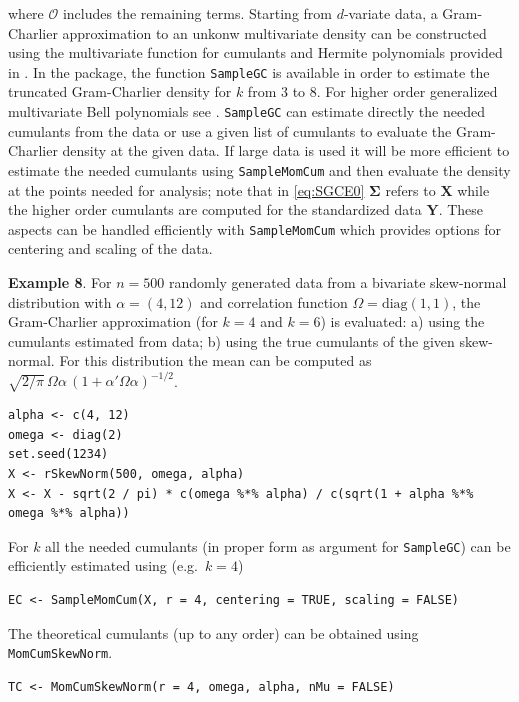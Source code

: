 where \(\mathcal{O}\) includes the remaining terms. Starting from \(d\)-variate data, a Gram-Charlier approximation to an unkonw multivariate density can be constructed using the multivariate function for cumulants and Hermite polynomials provided in . In the package, the function \texttt{SampleGC} is available in order to estimate the truncated Gram-Charlier density for \(k\) from \(3\) to \(8\). For higher order generalized multivariate Bell polynomials see . \texttt{SampleGC} can estimate directly the needed cumulants from the data or use a given list of cumulants to evaluate the Gram-Charlier density at the given data. If large data is used it will be more efficient to estimate the needed cumulants using \texttt{SampleMomCum} and then evaluate the density at the points needed for analysis; note that in \eqref{eq:SGCE0} \(\boldsymbol{\Sigma}\) refers to \(\mathbf{X}\) while the higher order cumulants are computed for the standardized data \(\mathbf{Y}\). These aspects can be handled efficiently with \texttt{SampleMomCum} which provides options for centering and scaling of the data.

\textbf{Example 8}. For \(n=500\) randomly generated data from a bivariate skew-normal distribution with \(\alpha=(4,12)\) and correlation function \(\Omega= \text{diag} (1,1)\), the Gram-Charlier approximation (for \(k=4\) and \(k=6\)) is evaluated: a) using the cumulants estimated from data; b) using the true cumulants of the given skew-normal. For this distribution the mean can be computed as \(\sqrt{2/\pi} \, \Omega \alpha \, (1+\alpha' \Omega \alpha)^{-1/2}\).

\begin{verbatim}
alpha <- c(4, 12)
omega <- diag(2)
set.seed(1234)
X <- rSkewNorm(500, omega, alpha) 
X <- X - sqrt(2 / pi) * c(omega %*% alpha) / c(sqrt(1 + alpha %*% omega %*% alpha))
\end{verbatim}

For \(k\) all the needed cumulants (in proper form as argument for \texttt{SampleGC}) can be efficiently estimated using (e.g.~\(k=4\))

\begin{verbatim}
EC <- SampleMomCum(X, r = 4, centering = TRUE, scaling = FALSE)
\end{verbatim}

The theoretical cumulants (up to any order) can be obtained using \texttt{MomCumSkewNorm}.

\begin{verbatim}
TC <- MomCumSkewNorm(r = 4, omega, alpha, nMu = FALSE)
\end{verbatim}

